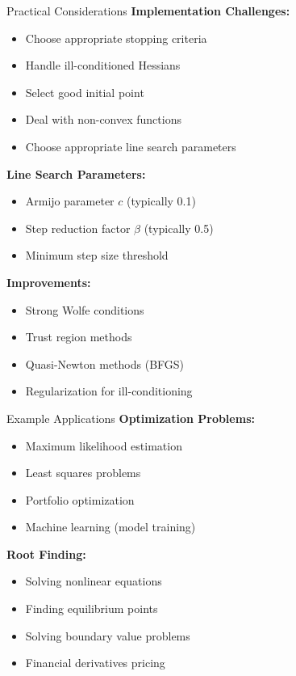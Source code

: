 \documentclass[10pt]{beamer}
\begin{document}
\begin{frame}[fragile]{Practical Considerations}
    \textbf{Implementation Challenges:}
    \begin{itemize}
        \item Choose appropriate stopping criteria
        \item Handle ill-conditioned Hessians
        \item Select good initial point
        \item Deal with non-convex functions
        \item Choose appropriate line search parameters
    \end{itemize}
    
    \textbf{Line Search Parameters:}
    \begin{itemize}
        \item Armijo parameter $c$ (typically 0.1)
        \item Step reduction factor $\beta$ (typically 0.5)
        \item Minimum step size threshold
    \end{itemize}
    
    \textbf{Improvements:}
    \begin{itemize}
        \item Strong Wolfe conditions
        \item Trust region methods
        \item Quasi-Newton methods (BFGS)
        \item Regularization for ill-conditioning
    \end{itemize}
\end{frame}

\begin{frame}[fragile]{Example Applications}
    \textbf{Optimization Problems:}
    \begin{itemize}
        \item Maximum likelihood estimation
        \item Least squares problems
        \item Portfolio optimization
        \item Machine learning (model training)
    \end{itemize}
    
    \textbf{Root Finding:}
    \begin{itemize}
        \item Solving nonlinear equations
        \item Finding equilibrium points
        \item Solving boundary value problems
        \item Financial derivatives pricing
    \end{itemize}
\end{frame}
\end{document}
